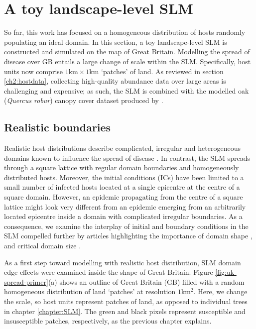 \section{A toy landscape-level SLM}

So far, this work has focused on a homogeneous distribution of hosts randomly populating an ideal domain. 
In this section, a toy landscape-level SLM is constructed and simulated on the map of Great Britain.
Modelling the spread of disease over GB entails a large change of scale within the SLM.
Specifically, host units now comprise $\mathrm{1km \times 1km}$ `patches' of land. 
As reviewed in section \ref{ch2:hostdata}, 
collecting high-quality abundance data over large areas is challenging and expensive; 
as such, the SLM is combined with the modelled oak (\textit{Quercus robur}) canopy cover dataset produced by \cite{hill.data}.

\subsection{Realistic boundaries}

Realistic host distributions describe complicated, irregular and heterogeneous domains
known to influence the spread of disease \cite{madden1995plant}.
In contrast, the SLM spreads through a square lattice with regular domain boundaries and homogeneously distributed hosts.
Moreover, the initial conditions (ICs) have been limited to a small number of infected hosts
located at a single epicentre at the centre of a square domain.
However, an epidemic propagating from the centre of a square lattice might look very different
from an epidemic emerging from an arbitrarily located epicentre inside a domain with complicated irregular boundaries.
As a consequence, we examine the interplay of initial and boundary conditions in the SLM\textemdash
compelled further by articles highlighting the importance of domain shape \cite{mikaberidze2016invasiveness},
and critical domain size \cite{abad2020reaction, reimer2017critical}.

As a first step toward modelling with realistic host distribution,
SLM domain edge effects were examined inside the shape of Great Britain.
Figure \ref{fig:uk-spread-primer}(a) shows an outline of Great Britain (GB) filled 
with a random homogeneous distribution of land `patches' at resolution $1\mathrm{km^2}$. 
Here, we change the scale, so host units represent patches of land, 
as opposed to individual trees in chapter \ref{chapter:SLM}.
The green and black pixels represent susceptible and insusceptible patches, 
respectively, as the previous chapter explains.

